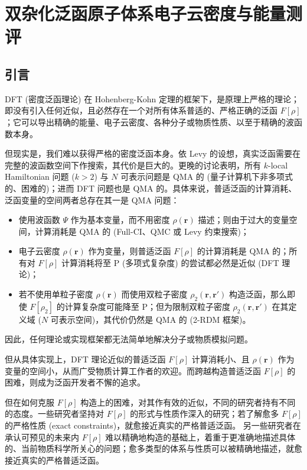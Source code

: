 
\section{双杂化泛函原子体系电子云密度与能量测评}

\subsection{引言}

DFT (密度泛函理论) 在 Hohenberg-Kohn 定理\cite{Hohenberg-Kohn.PR.1964}的框架下，是原理上严格的理论；即没有引入任何近似，且必然存在一个对所有体系普适的、严格正确的泛函 $F[\rho]$；它可以导出精确的能量、电子云密度、各种分子或物质性质、以至于精确的波函数本身。

但现实是，我们难以获得严格的密度泛函本身。依 Levy 的设想\cite{Levy-Levy.PNAS.1979}，真实泛函需要在完整的波函数空间下作搜索，其代价是巨大的。更晚的讨论表明，所有 $k$-local Hamiltonian 问题 ($k > 2$) 与 $N$ 可表示问题是 QMA 的 (量子计算机下非多项式的、困难的)\cite{Kempe-Regev.SJC.2006, Liu-Verstraete.PRL.2007}；进而 DFT 问题也是 QMA 的\cite{Schuch-Verstraete.NP.2009}。具体来说，普适泛函的计算消耗、泛函变量的空间两者总存在其一是 QMA 问题：
\begin{itemize}[nosep]
    \item 使用波函数 $\Psi$ 作为基本变量，而不用密度 $\rho(\bm{r})$ 描述；则由于过大的变量空间，计算消耗是 QMA 的 (Full-CI、QMC 或 Levy 约束搜索)；
    \item 电子云密度 $\rho(\bm{r})$ 作为变量，则普适泛函 $F[\rho]$ 的计算消耗是 QMA 的；所有对 $F[\rho]$ 计算消耗将至 P (多项式复杂度) 的尝试都必然是近似 (DFT 理论)；
    \item 若不使用单粒子密度 $\rho(\bm{r})$ 而使用双粒子密度 $\rho_2(\bm{r}, \bm{r}')$ 构造泛函，那么即使 $F[\rho_2]$ 的计算复杂度可能降至 P；但为限制双粒子密度 $\rho_2 (\bm{r}, \bm{r}')$ 在其定义域 ($N$ 可表示空间)，其代价仍然是 QMA 的 (2-RDM 框架)。
\end{itemize}
因此，任何理论或实现框架都无法简单地解决分子或物质模拟问题。

但从具体实现上，DFT 理论近似的普适泛函 $F[\rho]$ 计算消耗小、且 $\rho(\bm{r})$ 作为变量的空间小，从而广受物质计算工作者的欢迎。而跨越构造普适泛函 $F[\rho]$ 的困难，则成为泛函开发者不懈的追求。

但在如何克服 $F[\rho]$ 构造上的困难，对其作有效的近似，不同的研究者持有不同的态度。一些研究者坚持对 $F[\rho]$ 的形式与性质作深入的研究；若了解愈多 $F[\rho]$ 的严格性质 (exact constraints)，就愈接近真实的严格普适泛函\cite{Kohn-Sham.PR.1965, Slater-Slater.PR.1951, Vosko-Nusair.CJP.1980, Perdew-Ernzerhof.PRL.1996, Adamo-Barone.JCP.1999, Ernzerhof-Scuseria.JCP.1999, Tao-Scuseria.PRL.2003, Cohen-Yang.CR.2012, Su-Xu.JCP.2014, Sun-Perdew.PRL.2015, Medvedev-Lyssenko.S.2017}。
另一些研究者在承认可预见的未来内 $F[\rho]$ 难以精确地构造的基础上，着重于更准确地描述具体的、当前物质科学所关心的问题；愈多类型的体系与性质可以被精确地描述，就愈接近真实的严格普适泛函\cite{Becke-Becke.PRA.1988, Lee-Parr.PRB.1988, Becke-Becke.JCP.1993, Zhao-Truhlar.JCP.2006, Grimme-Grimme.JCP.2006, Zhao-Truhlar.TCA.2008, Zhang-Goddard.PNAS.2009, Chai-Head-Gordon.JCP.2009, Zhang-Goddard.PNAS.2011, Zhang-Xu.JCP.2012, Yu-Truhlar.JCP.2016, Chen-Weinan.JCTC.2021}。

